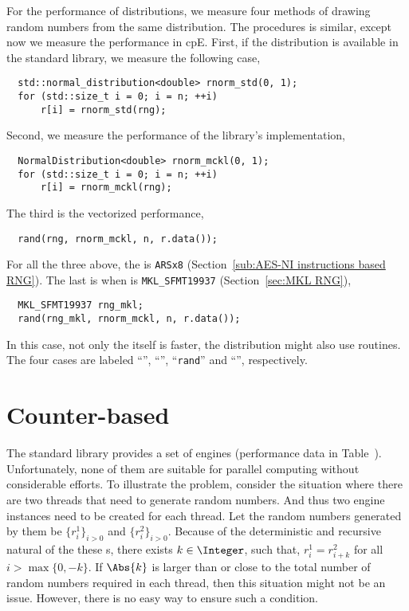 For the performance of distributions, we measure four methods of drawing random
numbers from the same distribution. The procedures is similar, except now we
measure the performance in cpE. First, if the distribution is available in the
standard library, we measure the following case,
\begin{Verbatim}
  std::normal_distribution<double> rnorm_std(0, 1);
  for (std::size_t i = 0; i = n; ++i)
      r[i] = rnorm_std(rng);
\end{Verbatim}
Second, we measure the performance of the library's implementation,
\begin{Verbatim}
  NormalDistribution<double> rnorm_mckl(0, 1);
  for (std::size_t i = 0; i = n; ++i)
      r[i] = rnorm_mckl(rng);
\end{Verbatim}
The third is the vectorized performance,
\begin{Verbatim}
  rand(rng, rnorm_mckl, n, r.data());
\end{Verbatim}
For all the three above, the \rng is \verb|ARSx8| (Section~\ref{sub:AES-NI
  instructions based RNG}). The last is when \rng is \verb|MKL_SFMT19937|
(Section~\ref{sec:MKL RNG}),
\begin{Verbatim}
  MKL_SFMT19937 rng_mkl;
  rand(rng_mkl, rnorm_mckl, n, r.data());
\end{Verbatim}
In this case, not only the \rng itself is faster, the distribution might also
use \mkl routines. The four cases are labeled ``\std'', ``\mckl'',
``\verb|rand|'' and ``\mkl'', respectively.

\section{Counter-based \protect\rng}
\label{sec:Counter-based RNG}

The standard library provides a set of \rng engines (performance data in
Table~). Unfortunately, none of
them are suitable for parallel computing without considerable efforts. To
illustrate the problem, consider the situation where there are two threads that
need to generate random numbers. And thus two \rng engine instances need to be
created for each thread. Let the random numbers generated by them be
$\{r_i^1\}_{i>0}$ and $\{r_i^2\}_{i>0}$. Because of the deterministic and
recursive natural of the these \rng{}s, there exists $k\in\Integer$, such that,
$r_i^1 = r_{i + k}^2$ for all $i > \max\{0, -k\}$. If $\Abs{k}$ is larger than
or close to the total number of random numbers required in each thread, then
this situation might not be an issue. However, there is no easy way to ensure
such a condition.

